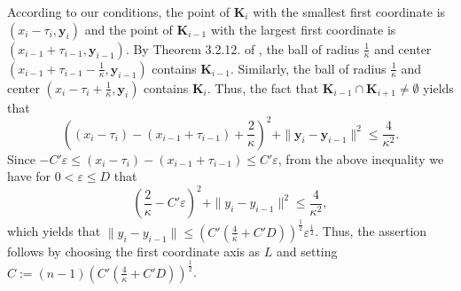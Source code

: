 \documentclass[12pt]{article}
\newcommand{\KK}{\mathbf K}
\begin{document}
According to our conditions, the point of $\KK_i$ with the smallest first coordinate is $(x_i-\tau_i, \mathbf{y}_i)$ and the point of $\KK_{i-1}$ with the largest first coordinate is $(x_{i-1}+\tau_{i-1},\mathbf{y}_{i-1})$. By Theorem 3.2.12. of \cite{Sch14}, the ball of radius $\frac{1}{\kappa}$ and center $(x_{i-1}+\tau_{i-1}-\frac{1}{\kappa},\mathbf{y}_{i-1})$ contains $\KK_{i-1}$. Similarly, the ball of radius $\frac{1}{\kappa}$ and center $(x_i-\tau_i+\frac{1}{\kappa},\mathbf{y}_i)$ contains $\KK_i$. Thus, the fact that $\KK_{i-1} \cap \KK_{i+1} \neq \emptyset$ yields that
\[
\left( (x_i - \tau_i) - (x_{i-1} + \tau_{i-1}) + \frac{2}{\kappa} \right)^2 + \|\mathbf{y}_i-\mathbf{y}_{i-1}\|^2 \leq \frac{4}{\kappa^2}.
\]
Since $- C' \varepsilon \leq (x_i - \tau_i) - (x_{i-1} + \tau_{i-1}) \leq C' \varepsilon$, from the above inequality we have for $0<\varepsilon \leq D$ that
\[
\left( \frac{2}{\kappa} - C' \varepsilon \right)^2 + \| y_i-y_{i-1}\|^2 \leq \frac{4}{\kappa^2},
\]
which yields that $\| y_i-y_{i-1} \| \leq \left(C'\left(\frac{4}{\kappa}+C'D\right)\right)^{\frac{1}{2}} {\varepsilon}^{\frac{1}{2}}$. Thus, the assertion follows by choosing the first coordinate axis as $L$ and setting $C:=(n-1)\left(C'\left(\frac{4}{\kappa}+C'D\right)\right)^{\frac{1}{2}} $.
\end{document}
